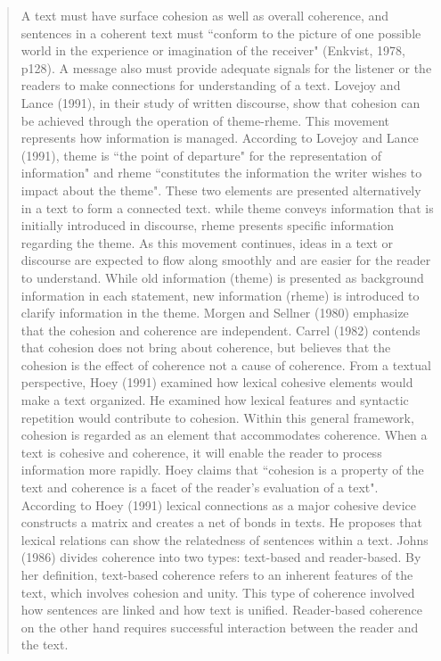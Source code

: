 \begin{quotation}
A text must have surface cohesion as well as overall coherence, and sentences in a coherent text must ``conform to the picture of one possible world in the experience or imagination of the receiver" (Enkvist, 1978, p128).
A message also must provide adequate signals for the listener or the readers to make connections for understanding of a text. 
Lovejoy and Lance (1991), in their study of written discourse, show that cohesion can be achieved through the operation of theme-rheme. 
This movement represents how information is managed.
According to Lovejoy and Lance (1991), theme is ``the point of departure" for the representation of information" and rheme ``constitutes the information the writer wishes to impact about the theme".
These two elements are presented alternatively in a text to form a connected text. 
while theme conveys information that is initially introduced in discourse, rheme presents specific information regarding the theme. 
As this movement continues, ideas in a text or discourse are expected to flow along smoothly and are easier for the reader to understand. 
While old information (theme) is presented as background information in each statement, new information (rheme) is introduced to clarify information in the theme. 
Morgen and Sellner (1980) emphasize that the cohesion and coherence are independent.  
Carrel (1982) contends that cohesion does not bring about coherence, but believes that the cohesion is the effect of coherence not a cause of coherence. 
From a textual perspective, Hoey (1991) examined how lexical cohesive elements would make a text organized. 
He examined how lexical features and syntactic repetition would contribute to cohesion. 
Within this general framework, cohesion is regarded as an element that accommodates coherence. 
When a text is cohesive and coherence, it will enable the reader to process information more rapidly. 
Hoey claims that ``cohesion is a property of the text and coherence is a facet of the reader's evaluation of a text". 
According to Hoey (1991) lexical connections as a major cohesive device constructs a matrix and creates a net of bonds in texts. 
He proposes that lexical relations can show the relatedness of sentences within a text. 
Johns (1986) divides coherence into two types: text-based and reader-based. 
By her definition, text-based coherence refers to an inherent features of the text, which involves cohesion and unity. 
This type of coherence involved how sentences are linked and how text is unified. 
Reader-based coherence on the other hand requires successful interaction between the reader and the text. 

\end{quotation}
